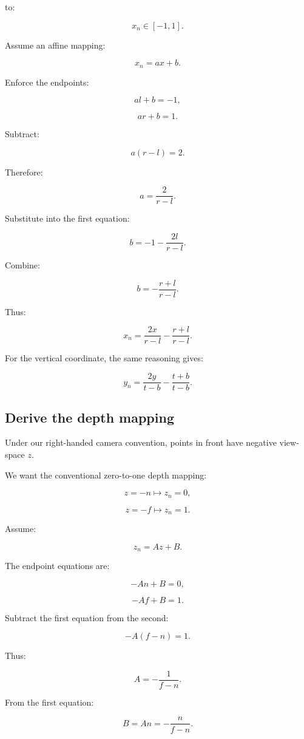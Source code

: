 to:

\[
 x_n\in[-1,1].
\]

Assume an affine mapping:

\[
 x_n=ax+b.
\]

Enforce the endpoints:

\[
 al+b=-1,
\]

\[
 ar+b=1.
\]

Subtract:

\[
 a(r-l)=2.
\]

Therefore:

\[
 \boxed{ a=\frac2{r-l} }.
\]

Substitute into the first equation:

\[
 b=-1-\frac{2l}{r-l}.
\]

Combine:

\[
 \boxed{ b=-\frac{r+l}{r-l} }.
\]

Thus:

\[
 \boxed{ x_n= \frac{2x}{r-l} -\frac{r+l}{r-l} }.
\]

For the vertical coordinate, the same reasoning gives:

\[
 \boxed{ y_n= \frac{2y}{t-b} -\frac{t+b}{t-b} }.
\]

\subsection{Derive the depth mapping}\label{02-foundations-ii-ch033-derive-the-depth-mapping}

Under our right-handed camera convention, points in front have negative view-space \(z\).

We want the conventional zero-to-one depth mapping:

\[
 z=-n\longmapsto z_n=0,
\]

\[
 z=-f\longmapsto z_n=1.
\]

Assume:

\[
 z_n=Az+B.
\]

The endpoint equations are:

\[
 -An+B=0,
\]

\[
 -Af+B=1.
\]

Subtract the first equation from the second:

\[
 -A(f-n)=1.
\]

Thus:

\[
 \boxed{ A=-\frac1{f-n} }.
\]

From the first equation:

\[
 B=An=-\frac n{f-n}.
\]

